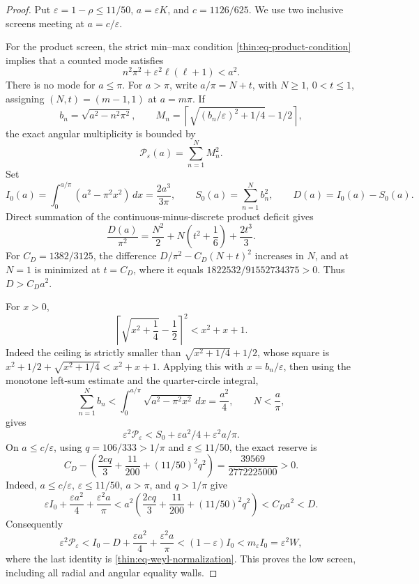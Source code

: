\documentclass[11pt]{article}
\numberwithin{equation}{section}
\theoremstyle{definition}
\theoremstyle{remark}
\begin{document}
\begin{proof}
Put \(\varepsilon=1-\rho\leq11/50\),
\(a=\varepsilon K\), and \(c=1126/625\).  We use two inclusive screens
meeting at \(a=c/\varepsilon\).

For the product screen, the strict min--max condition
\eqref{thin:eq-product-condition} implies that a counted mode satisfies
\[
 n^2\pi^2+\varepsilon^2\ell(\ell+1)<a^2.
\]
There is no mode for \(a\leq\pi\).  For \(a>\pi\), write
\(a/\pi=N+t\), with \(N\geq1\), \(0<t\leq1\), assigning
\((N,t)=(m-1,1)\) at \(a=m\pi\).  If
\[
 b_n=\sqrt{a^2-n^2\pi^2},\qquad
 M_n=\left\lceil\sqrt{(b_n/\varepsilon)^2+1/4}-1/2\right\rceil,
\]
the exact angular multiplicity is bounded by
\[
 \mathcal P_\varepsilon(a)=\sum_{n=1}^N M_n^2.
\]
Set
\[
 I_0(a)=\int_0^{a/\pi}(a^2-\pi^2x^2)\,dx
       =\frac{2a^3}{3\pi},
 \qquad
 S_0(a)=\sum_{n=1}^N b_n^2,
 \qquad D(a)=I_0(a)-S_0(a).
\]
Direct summation of the continuous-minus-discrete product deficit gives
\begin{equation}
 \frac{D(a)}{\pi^2}=\frac{N^2}{2}
 +N\left(t^2+\frac16\right)+\frac{2t^3}{3}.
 \label{cm:eq-optical-product-deficit}
\end{equation}
For \(C_D=1382/3125\), the difference
\(D/\pi^2-C_D(N+t)^2\) increases in \(N\), and at \(N=1\) is minimized
at \(t=C_D\), where it equals
\(1822532/91552734375>0\).  Thus \(D>C_Da^2\).

For \(x>0\),
\[
\left\lceil\sqrt{x^2+\frac14}-\frac12\right\rceil^2
 <x^2+x+1.
\]
Indeed the ceiling is strictly smaller than
\(\sqrt{x^2+1/4}+1/2\), whose square is
\(x^2+1/2+\sqrt{x^2+1/4}<x^2+x+1\).  Applying this with
\(x=b_n/\varepsilon\), then using the monotone left-sum estimate and the
quarter-circle integral,
\[
 \sum_{n=1}^N b_n
 <\int_0^{a/\pi}\sqrt{a^2-\pi^2x^2}\,dx=\frac{a^2}{4},
 \qquad N<\frac a\pi,
\]
gives
\[
 \varepsilon^2\mathcal P_\varepsilon
 <S_0+\varepsilon a^2/4+\varepsilon^2a/\pi.
\]
On \(a\leq c/\varepsilon\), using \(q=106/333>1/\pi\) and
\(\varepsilon\leq11/50\), the exact reserve is
\begin{equation}
 C_D-\left(\frac{2cq}{3}+\frac{11}{200}
 +(11/50)^2q^2\right)
 =\frac{39569}{2772225000}>0.
 \label{cm:eq-optical-low-reserve}
\end{equation}
Indeed, \(a\leq c/\varepsilon\), \(\varepsilon\leq11/50\),
\(a>\pi\), and \(q>1/\pi\) give
\[
 \varepsilon I_0+\frac{\varepsilon a^2}{4}
 +\frac{\varepsilon^2a}{\pi}
 <a^2\left(\frac{2cq}{3}+\frac{11}{200}
 +(11/50)^2q^2\right)<C_Da^2<D.
\]
Consequently
\[
 \varepsilon^2\mathcal P_\varepsilon
 <I_0-D+\frac{\varepsilon a^2}{4}
 +\frac{\varepsilon^2a}{\pi}
 <(1-\varepsilon)I_0<m_\varepsilon I_0
 =\varepsilon^2W,
\]
where the last identity is \eqref{thin:eq-weyl-normalization}.
This proves the low screen, including all radial and angular equality walls.


\end{proof}
\end{document}
